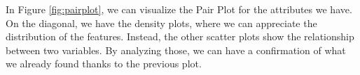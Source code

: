 In Figure \ref{fig:pairplot}, we can visualize the Pair Plot for the attributes we have.\\
On the diagonal, we have the density plots, where we can appreciate the distribution of the features. Instead, the other scatter plots show the relationship between two variables. By analyzing those, we can have a confirmation of what we already found thanks to the previous plot. 

